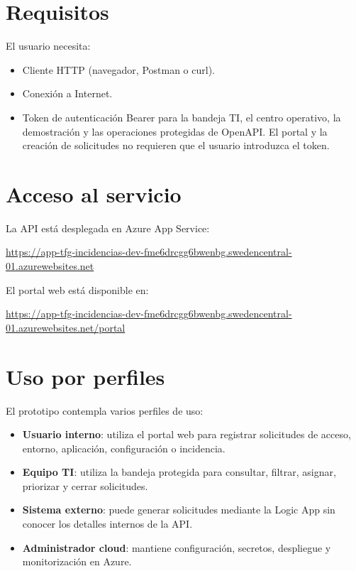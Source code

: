 \section{Requisitos}

El usuario necesita:

\begin{itemize}
    \item Cliente HTTP (navegador, Postman o curl).
    \item Conexión a Internet.
    \item Token de autenticación Bearer para la bandeja TI, el centro operativo, la demostración y las operaciones protegidas de OpenAPI. El portal y la creación de solicitudes no requieren que el usuario introduzca el token.
\end{itemize}

\section{Acceso al servicio}

La API está desplegada en Azure App Service:

\begingroup
\small
\begin{sloppypar}
\url{https://app-tfg-incidencias-dev-fme6drcgg6bwenbg.swedencentral-01.azurewebsites.net}
\end{sloppypar}
\endgroup

El portal web está disponible en:

\begingroup
\small
\begin{sloppypar}
\url{https://app-tfg-incidencias-dev-fme6drcgg6bwenbg.swedencentral-01.azurewebsites.net/portal}
\end{sloppypar}
\endgroup


\section{Uso por perfiles}

El prototipo contempla varios perfiles de uso:

\begin{itemize}
    \item \textbf{Usuario interno}: utiliza el portal web para registrar solicitudes de acceso, entorno, aplicación, configuración o incidencia.
    \item \textbf{Equipo TI}: utiliza la bandeja protegida para consultar, filtrar, asignar, priorizar y cerrar solicitudes.
    \item \textbf{Sistema externo}: puede generar solicitudes mediante la Logic App sin conocer los detalles internos de la API.
    \item \textbf{Administrador cloud}: mantiene configuración, secretos, despliegue y monitorización en Azure.
\end{itemize}
